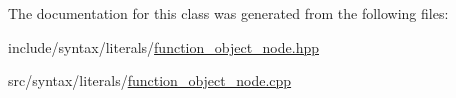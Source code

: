 The documentation for this class was generated from the following files\+:\begin{DoxyCompactItemize}
\item 
include/syntax/literals/\hyperlink{function__object__node_8hpp}{function\+\_\+object\+\_\+node.\+hpp}\item 
src/syntax/literals/\hyperlink{function__object__node_8cpp}{function\+\_\+object\+\_\+node.\+cpp}\end{DoxyCompactItemize}
